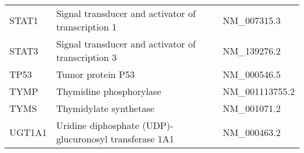 \begin{table}
\begin{tabular}{ l l l }
    STAT1 & Signal transducer and activator of transcription 1 & NM\_007315.3 \\
    STAT3 & Signal transducer and activator of transcription 3 & NM\_139276.2 \\
    TP53 & Tumor protein P53 & NM\_000546.5 \\
    TYMP & Thymidine phosphorylase & NM\_001113755.2 \\
    TYMS & Thymidylate synthetase & NM\_001071.2 \\
    UGT1A1 & Uridine diphosphate (UDP)-glucuronosyl transferase 1A1 & NM\_000463.2\\
    \bottomrule
    \end{tabular}
\end{table}
